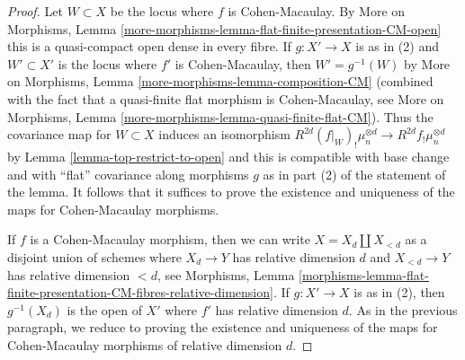 \begin{proof}
Let $W \subset X$ be the locus where $f$ is Cohen-Macaulay. By
More on Morphisms, Lemma
\ref{more-morphisms-lemma-flat-finite-presentation-CM-open}
this is a quasi-compact open dense in every fibre.
If $g : X' \to X$ is as in (2) and $W' \subset X'$ is the
locus where $f'$ is Cohen-Macaulay, then
$W' = g^{-1}(W)$ by
More on Morphisms, Lemma \ref{more-morphisms-lemma-composition-CM}
(combined with the fact that a quasi-finite flat morphism
is Cohen-Macaulay, see More on Morphisms, Lemma
\ref{more-morphisms-lemma-quasi-finite-flat-CM}).
Thus the covariance map for $W \subset X$ induces
an isomorphism
$R^{2d}(f|_W)_!\mu_n^{\otimes d} \to R^{2d}f_!\mu_n^{\otimes d}$
by Lemma \ref{lemma-top-restrict-to-open}
and this is compatible with base change and with ``flat'' covariance
along morphisms $g$ as in part (2) of the statement of the lemma.
It follows that it suffices to prove the existence and uniqueness
of the maps for Cohen-Macaulay morphisms.

\medskip\noindent
If $f$ is a Cohen-Macaulay morphism, then we can
write $X = X_d \amalg X_{<d}$ as a disjoint union of schemes
where $X_d \to Y$ has relative dimension $d$ and $X_{< d} \to Y$
has relative dimension $< d$, see 
Morphisms, Lemma
\ref{morphisms-lemma-flat-finite-presentation-CM-fibres-relative-dimension}.
If $g : X' \to X$ is as in (2), then $g^{-1}(X_d)$ is the open of $X'$
where $f'$ has relative dimension $d$.
As in the previous paragraph, we reduce to proving the existence
and uniqueness of the maps for Cohen-Macaulay morphisms of
relative dimension $d$.


\end{proof}
